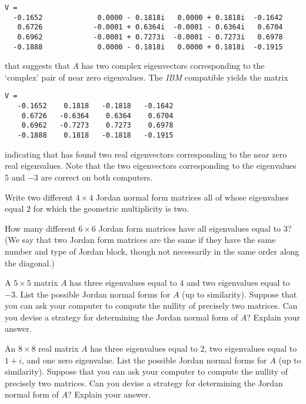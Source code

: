 \documentclass{ximera}
\begin{document}
{\scriptsize \begin{verbatim}
V = 
  -0.1652             0.0000 - 0.1818i   0.0000 + 0.1818i  -0.1642          
   0.6726            -0.0001 + 0.6364i  -0.0001 - 0.6364i   0.6704          
   0.6962            -0.0001 + 0.7273i  -0.0001 - 0.7273i   0.6978          
  -0.1888             0.0000 - 0.1818i   0.0000 + 0.1818i  -0.1915          
\end{verbatim}
\normalsize}

that suggests that $A$ has two complex eigenvectors corresponding 
to the `complex' pair of near zero eigenvalues.  The {\em IBM\/} 
compatible yields the matrix
\begin{verbatim}
V = 
   -0.1652    0.1818   -0.1818   -0.1642
    0.6726   -0.6364    0.6364    0.6704
    0.6962   -0.7273    0.7273    0.6978
   -0.1888    0.1818   -0.1818   -0.1915
\end{verbatim}
indicating that \Matlab has found two real eigenvectors corresponding 
to the near zero real eigenvalues.  Note that the two eigenvectors
corresponding to the eigenvalues $5$ and $-3$ are correct on both 
computers.     

\EXER

\TEXER


\begin{exercise} \label{c10.5.2}
Write two different $4\times 4$ Jordan normal form matrices all
of whose eigenvalues equal $2$ for which the geometric
multiplicity is two.
\end{exercise}

\begin{exercise} \label{c10.5.2A}
How many different $6\times 6$ Jordan form matrices have all eigenvalues 
equal to $3$? (We say that two Jordan form matrices are the same 
if they have the same number and type of Jordan block, though not
necessarily in the same order along the diagonal.)
\end{exercise}

\begin{exercise}  \label{c10.5.2B}
A $5\times 5$ matrix $A$ has three eigenvalues equal
to $4$ and two eigenvalues equal to $-3$.  List the possible Jordan normal 
forms for $A$ (up to similarity).  Suppose that you can ask your computer to
compute the nullity of precisely two matrices.  Can you devise a strategy for
determining the Jordan normal form of $A$?  Explain your answer.
\end{exercise}

\begin{exercise}  \label{c10.5.2C}
An $8\times 8$ real matrix $A$ has three eigenvalues equal to $2$, two 
eigenvalues equal to $1+i$, and one zero eigenvalue.  List the possible 
Jordan normal forms for $A$ (up to similarity).  Suppose that you can ask 
your computer to compute the nullity of precisely two matrices.  Can you 
devise a strategy for determining the Jordan normal form of $A$?  Explain 
your answer.
\end{exercise}
\end{document}
